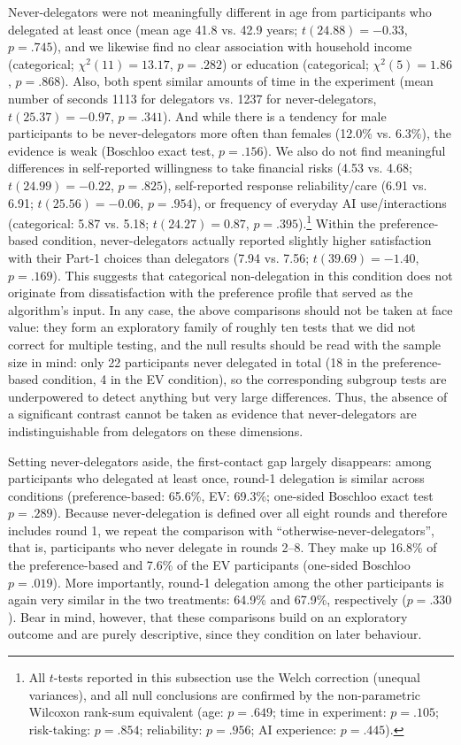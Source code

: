 \documentclass[a4paper, 12pt, fleqn]{article}
\theoremstyle{hypstyle}
\begin{document}
Never-delegators were not meaningfully different in age from participants who delegated at least once (mean age 41.8 vs. 42.9 years; $t(24.88) = -0.33$, $p = .745$), and we likewise find no clear association with household income (categorical; $\chi^2(11) = 13.17$, $p = .282$) or education (categorical; $\chi^2(5) = 1.86$, $p = .868$). Also, both spent similar amounts of time in the experiment (mean number of seconds 1113 for delegators vs. 1237 for never-delegators, $t(25.37) = -0.97$, $p = .341$). And while there is a tendency for male participants to be never-delegators more often than females (12.0\% vs. 6.3\%), the evidence is weak (Boschloo exact test, $p = .156$). We also do not find meaningful differences in self-reported willingness to take financial risks (4.53 vs. 4.68; $t(24.99) = -0.22$, $p = .825$), self-reported response reliability/care (6.91 vs. 6.91; $t(25.56) = -0.06$, $p = .954$), or frequency of everyday AI use/interactions (categorical: 5.87 vs. 5.18; $t(24.27) = 0.87$, $p = .395$).\footnote{All $t$-tests reported in this subsection use the Welch correction (unequal variances), and all null conclusions are confirmed by the non-parametric Wilcoxon rank-sum equivalent (age: $p = .649$; time in experiment: $p = .105$; risk-taking: $p = .854$; reliability: $p = .956$; AI experience: $p = .445$).}
Within the preference-based condition, never-delegators actually reported slightly higher satisfaction with their Part-1 choices than delegators (7.94 vs. 7.56; $t(39.69) = -1.40$, $p = .169$). This suggests that categorical non-delegation in this condition does not originate from dissatisfaction with the preference profile that served as the algorithm's input. In any case, the above comparisons should not be taken at face value: they form an exploratory family of roughly ten tests that we did not correct for multiple testing, and the null results should be read with the sample size in mind: only 22 participants never delegated in total (18 in the preference-based condition, 4 in the EV condition), so the corresponding subgroup tests are underpowered to detect anything but very large differences. Thus, the absence of a significant contrast cannot be taken as evidence that never-delegators are indistinguishable from delegators on these dimensions.

Setting never-delegators aside, the first-contact gap largely disappears: among participants who delegated at least once, round-1 delegation is similar across conditions (preference-based: 65.6\%, EV: 69.3\%; one-sided Boschloo exact test $p = .289$). Because never-delegation is defined over all eight rounds and therefore includes round 1, we repeat the comparison with ``otherwise-never-delegators'', that is, participants who never delegate in rounds 2--8. They make up 16.8\% of the preference-based and 7.6\% of the EV participants (one-sided Boschloo $p = .019$). More importantly, round-1 delegation among the other participants is again very similar in the two treatments: 64.9\% and 67.9\%, respectively ($p = .330$). Bear in mind, however, that these comparisons build on an exploratory outcome and are purely descriptive, since they condition on later behaviour.
\end{document}

